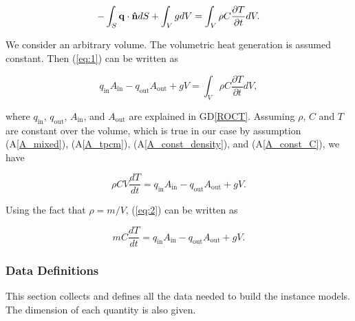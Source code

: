\documentclass[12pt]{article}
\newcommand{\dref}[1]{GD\ref{#1}}
\newcommand{\aref}[1]{A\ref{#1}}
\begin{document}
\begin{equation}
-\int_S{ \bf{q\cdot \hat n}} dS+\int_V g dV= \int_V \rho C \frac{\partial T}{\partial t}dV. \label{eq:1}
\end{equation}

\noindent
We consider an arbitrary volume.  The volumetric heat generation is assumed
constant.  Then (\ref{eq:1}) can be written as


\begin{equation*}
  q_{\mathrm{in}} A_{\mathrm{in}} - q_{\mathrm{out}} A_{\mathrm{out}} + g V = \int_V \rho C \frac{\partial T}{\partial t}dV,
\end{equation*}

\noindent where $q_{\mathrm{in}}$, $q_{\mathrm{out}}$, $A_{\mathrm{in}}$, and 
$A_{\mathrm{out}}$ are explained in \dref{ROCT}.  Assuming $\rho$, $C$ and $T$ are
constant over the volume, which is true in our case by assumption (\aref{A_mixed}),
(\aref{A_tpcm}), (\aref{A_const_density}), and (\aref{A_const_C}), we have

\begin{equation}
\rho C V\frac{dT}{dt} = q_{\mathrm{in}} A_{\mathrm{in}} - q_{\mathrm{out}} A_{\mathrm{out}} + g V. \label{eq:2}
\end{equation}

\noindent
Using the fact that $\rho = {m}/{V}$, (\ref{eq:2}) can be written as

\begin{equation*}
m C \frac{dT}{dt} = q_{\mathrm{in}} A_{\mathrm{in}} - q_{\mathrm{out}} A_{\mathrm{out}} + g V.
\end{equation*}

\subsubsection{Data Definitions}\label{sec_datadef}

This section collects and defines all the data needed to build the instance
models. The dimension of each quantity is also given.

~\newline
\end{document}
